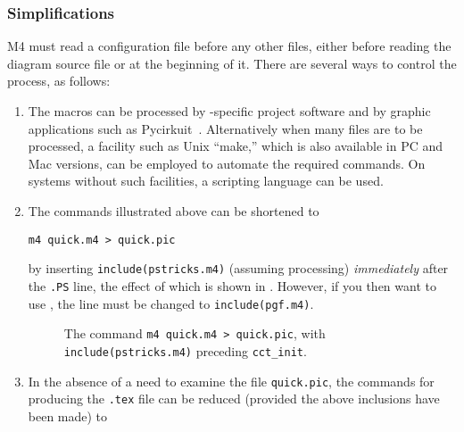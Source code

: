 \subsubsection{Simplifications\label{Simplifications:}}
M4 must read a configuration file before any other files,
either before reading the diagram source file or at the beginning of it.
There are several ways to control the process, as follows:
\begin{enumerate}
\item
The macros can be processed by \latex-specific
project software and by graphic applications such as
Pycirkuit~\cite{Mas2019}.
Alternatively when many files are to be processed, a facility such as
Unix ``make,'' which is also available in PC and Mac versions, can be employed
to automate the required commands.  On systems without such
facilities, a scripting language can be used.

\item
The \Mfour commands illustrated above can be shortened to

\verb|m4 quick.m4 > quick.pic|

\noindent
by inserting {\tt include(pstricks.m4)} (assuming \PSTricks processing)
{\em immediately} after the {\tt .PS} line, the effect of which 
is shown in .
However, if you then want to use \TPGF,
the line must be changed to {\tt include(pgf.m4)}.
\begin{figure}[h!]
   
   \caption{The command {\tt m4 quick.m4 > quick.pic},
   with {\tt include(pstricks.m4)} preceding {\tt cct\_init}.}
   \label{ConfigB}
   \end{figure}
%   


\item
In the absence of a need to examine the file {\tt quick.pic},
the commands for producing the {\tt .tex} file can be reduced
(provided the above inclusions have been made) to


\end{enumerate}
